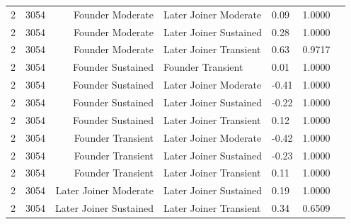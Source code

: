 \begin{table}[H]
\begin{tabular}{l r r l l r r}
2 & 3054 & Founder Moderate & Later Joiner Moderate & 0.09 & 1.0000 \\ 
2 & 3054 & Founder Moderate & Later Joiner Sustained & 0.28 & 1.0000 \\ 
2 & 3054 & Founder Moderate & Later Joiner Transient & 0.63 & 0.9717 \\ 
2 & 3054 & Founder Sustained & Founder Transient & 0.01 & 1.0000 \\ 
2 & 3054 & Founder Sustained & Later Joiner Moderate & -0.41 & 1.0000 \\ 
2 & 3054 & Founder Sustained & Later Joiner Sustained & -0.22 & 1.0000 \\ 
2 & 3054 & Founder Sustained & Later Joiner Transient & 0.12 & 1.0000 \\ 
2 & 3054 & Founder Transient & Later Joiner Moderate & -0.42 & 1.0000 \\ 
2 & 3054 & Founder Transient & Later Joiner Sustained & -0.23 & 1.0000 \\ 
2 & 3054 & Founder Transient & Later Joiner Transient & 0.11 & 1.0000 \\ 
2 & 3054 & Later Joiner Moderate & Later Joiner Sustained & 0.19 & 1.0000 \\ 
2 & 3054 & Later Joiner Sustained & Later Joiner Transient & 0.34 & 0.6509 \\ 
\bottomrule
\end{tabular}%
\label{tab:codebase_graph_latex_repository_graph_component_time_series_holm_bonferroni_no_sig_one_and_twopackages} 
\end{table}
\newpage 
